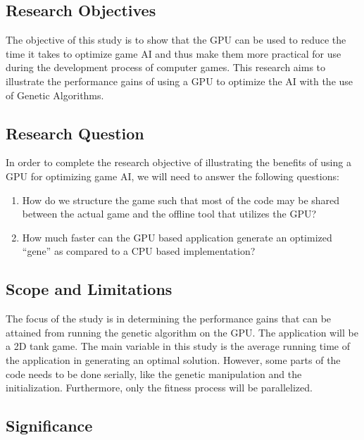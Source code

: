 \documentclass{acm_proc_article-sp}
\begin{document}
\subsection{Research Objectives}

The objective of this study is to show that the GPU can be used to reduce the time
it takes to optimize game AI and thus make them more practical for use during the
development process of computer games. This research aims to illustrate the
performance gains of using a GPU to optimize the AI with the use of Genetic Algorithms.

\subsection{Research Question}

In order to complete the research objective of illustrating the benefits of using
a GPU for optimizing game AI, we will need to answer the following questions:

\begin{enumerate}
 \item How do we structure the game such that most of the code may be shared between
the actual game and the offline tool that utilizes the GPU?

 \item How much faster can the GPU based application generate an optimized ``gene''
as compared to a CPU based implementation?
\end{enumerate}

\subsection{Scope and Limitations}

The focus of the study is in determining the performance gains that can be attained from
running the genetic algorithm on the GPU. The application will be a 2D tank game. The main 
variable in this study is the average running time of the application in generating 
an optimal solution. However, some parts of the code needs to be done serially, like the
genetic manipulation and the initialization. Furthermore, only the fitness process will be
parallelized.

\subsection{Significance}
\end{document}

